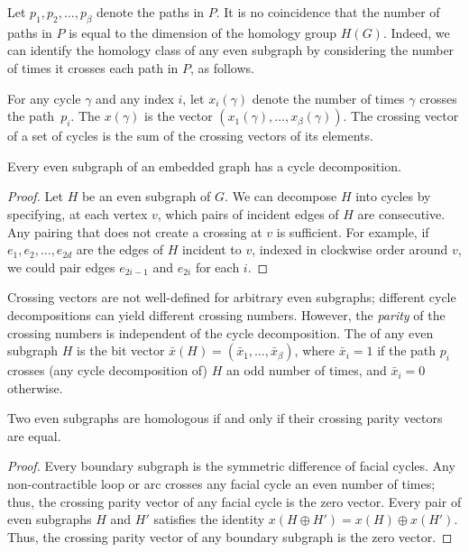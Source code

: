 Let $p_1, p_2, \dots, p_\beta$ denote the paths in $P$.  It is no coincidence that the number of paths in $P$ is equal to the dimension of the homology group $H(G)$.  Indeed, we can identify the homology class of any even subgraph by considering the number of times it crosses each path in $P$, as follows.

For any cycle $\gamma$ and any index $i$, let $x_i(\gamma)$ denote the number of times $\gamma$ crosses the path~$p_i$.  The  $x(\gamma)$ is the vector $(x_1(\gamma), \dots, x_\beta(\gamma))$.  The crossing vector of a set of cycles is the sum of the crossing vectors of its elements.
\begin{lemma}
\label{lem:decomposition}
Every even subgraph of an embedded graph has a cycle decomposition.
\end{lemma}

\begin{proof}
Let $H$ be an even subgraph of $G$.  We can decompose $H$ into cycles by specifying, at each vertex $v$, which pairs of incident edges of $H$ are consecutive.  Any pairing that does not create a crossing at $v$ is sufficient.  For example, if $e_1, e_2, \dots, e_{2d}$ are the edges of $H$ incident to $v$, indexed in clockwise order around $v$, we could pair edges $e_{2i-1}$ and $e_{2i}$ for each $i$.  
\end{proof}

Crossing vectors are not well-defined for arbitrary even subgraphs; different cycle decompositions can yield different crossing numbers.  However, the \emph{parity} of the crossing numbers is independent of the cycle decomposition.  The  of any even subgraph $H$ is the bit vector $\bar{x}(H) = (\bar{x}_1, \dots, \bar{x}_\beta)$, where $\bar{x}_i = 1$ if the path $p_i$ crosses (any cycle decomposition of) $H$ an odd number of times, and $\bar{x}_i = 0$ otherwise.

\begin{lemma}
Two even subgraphs are homologous if and only if their crossing parity vectors are equal.
\end{lemma}

\begin{proof}
Every boundary subgraph is the symmetric difference of facial cycles.  Any non-contractible loop or arc crosses any facial cycle an even number of times; thus, the crossing parity vector of any facial cycle is the zero vector.  Every pair of even subgraphs $H$ and $H'$ satisfies the identity $x(H\oplus H') = x(H) \oplus x(H')$.  Thus, the crossing parity vector of any boundary subgraph is the zero vector.
\end{proof}

